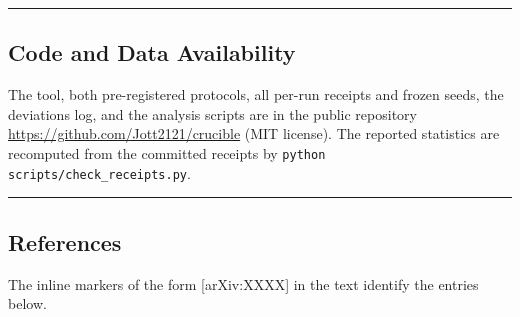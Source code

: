 \documentclass[
  11pt,
]{article}
\begin{document}
\begin{center}\rule{0.5\linewidth}{0.5pt}\end{center}

\subsection{Code and Data Availability}\label{code-and-data-availability}

The tool, both pre-registered protocols, all per-run receipts and frozen
seeds, the deviations log, and the analysis scripts are in the public
repository \url{https://github.com/Jott2121/crucible} (MIT license). The
reported statistics are recomputed from the committed receipts by
\texttt{python scripts/check\_receipts.py}.

\begin{center}\rule{0.5\linewidth}{0.5pt}\end{center}

\subsection{References}\label{references}

The inline markers of the form {[}arXiv:XXXX{]} in the text identify the
entries below.
\end{document}
